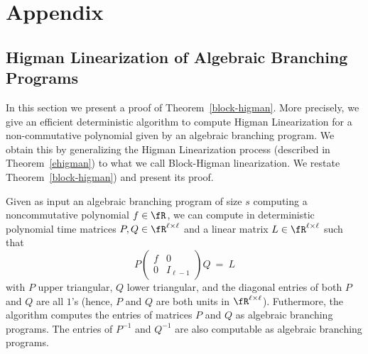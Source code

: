 \section{Appendix}

%

\subsection{Higman Linearization of Algebraic Branching Programs}

In this section we present a proof of Theorem~\ref{block-higman}. More
precisely, we give an efficient deterministic algorithm to compute
Higman Linearization for a non-commutative polynomial given by an
algebraic branching program. We obtain this by generalizing the Higman
Linearization process (described in Theorem~\ref{ehigman}) to what we call
Block-Higman linearization. We restate Theorem~\ref{block-higman}) and
present its proof.

%
%
%
%

\begin{theorem}\label{blockhigthm}
  Given as input an algebraic branching program of size $s$ computing
  a noncommutative polynomial $f\in\fR$, we can compute in
  deterministic polynomial time matrices
  $P, Q\in\fR^{\ell \times \ell}$ and a linear matrix
  $L\in\fR^{\ell\times \ell}$ such that
\begin{equation}\label{higeq-block-polynomial}
%
P\left(
\begin{array}{c|c}
f & 0 \\
\hline
0 & I_{\ell-1}
\end{array}
\right)Q ~=~L
\end{equation}
with $P$ upper triangular, $Q$ lower triangular, and the diagonal
entries of both $P$ and $Q$ are all $1$'s (hence, $P$ and $Q$ are both
units in $\fR^{\ell \times \ell}$). Futhermore, the algorithm computes
the entries of matrices $P$ and $Q$ as algebraic branching programs.
The entries of $P^{-1}$ and $Q^{-1}$ are also computable as algebraic
branching programs.

%
%
\end{theorem}

